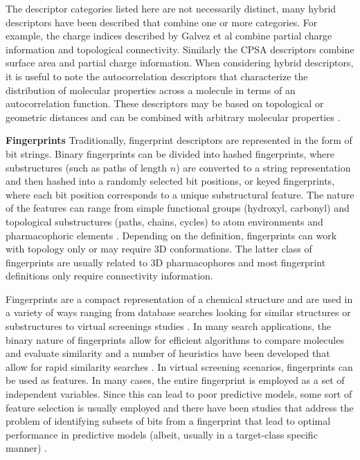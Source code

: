\documentclass[letterpaper, 12pt]{article}
\begin{document}
The descriptor categories listed here are not necessarily distinct,
many hybrid descriptors have been described that combine one or more
categories. For example, the charge indices described by Galvez et al
\cite{Galvez:1994aa} combine partial charge information and
topological connectivity. Similarly the CPSA descriptors combine
surface area and partial charge information. When considering hybrid
descriptors, it is useful to note the autocorrelation descriptors that
characterize the distribution of molecular properties across a
molecule in terms of an autocorrelation function. These descriptors
may be based on topological or geometric distances and can be combined
with arbitrary molecular properties \cite{Moreau:1980aa,Broto:1984aa}.

\textbf{Fingerprints} Traditionally, fingerprint descriptors are
represented in the form of bit strings. Binary fingerprints can be
divided into hashed fingerprints, where substructures (such as paths
of length $n$) are converted to a string representation and then
hashed into a randomly selected bit positions, or keyed fingerprints,
where each bit position corresponds to a unique substructural
feature. The nature of the features can range from simple functional
groups (hydroxyl, carbonyl) and topological substructures (paths,
chains, cycles) to atom environments \cite{Bremser1978,Bender:2004aa}
and pharmacophoric elements \cite{Renner:2006aa}. Depending on the
definition, fingerprints can work with topology only or may require 3D
conformations. The latter class of fingerprints are usually related to
3D pharmacophores and most fingerprint definitions only require
connectivity information. 

Fingerprints are a compact representation of a chemical structure and
are used in a variety of ways ranging from database searches looking
for similar structures or substructures to virtual screenings studies
\cite{Sun:2006kx}. In many search applications, the binary nature of
fingerprints allow for efficient algorithms to compare molecules and
evaluate similarity and a number of heuristics have been developed
that allow for rapid similarity searches
\cite{Baldi:2008aa,Swamidass:2007ab}. In virtual screening scenarios,
fingerprints can be used as features. In many cases, the entire
fingerprint is employed as a set of independent variables. Since this
can lead to poor predictive models, some sort of feature selection is
usually employed and there have been studies that address the problem
of identifying subsets of bits from a fingerprint that lead to optimal
performance in predictive models (albeit, usually in a target-class
specific manner) \cite{Xue:2004fk}.
\end{document}

